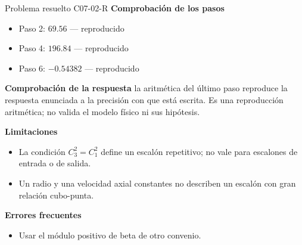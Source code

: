 \documentclass[10pt,openany]{book}
\begin{document}
\begin{studiumworked}{Problema resuelto C07-02-R}
\noindent\textbf{Comprobación de los pasos}
\begin{itemize}
\item Paso 2: $69.56$ — reproducido
\item Paso 4: $196.84$ — reproducido
\item Paso 6: $-0.54382$ — reproducido
\end{itemize}

\noindent\textbf{Comprobación de la respuesta} la aritmética del último paso reproduce la respuesta enunciada a la precisión con que está escrita. Es una reproducción aritmética; no valida el modelo físico ni sus hipótesis.

\noindent\textbf{Limitaciones}
\begin{itemize}
\item La condición $C_3^2=C_1^2$ define un escalón repetitivo; no vale para escalones de entrada o de salida.
\item Un radio y una velocidad axial constantes no describen un escalón con gran relación cubo-punta.
\end{itemize}

\noindent\textbf{Errores frecuentes}
\begin{itemize}
\item Usar el módulo positivo de beta de otro convenio.
\end{itemize}
\end{studiumworked}
\end{document}

